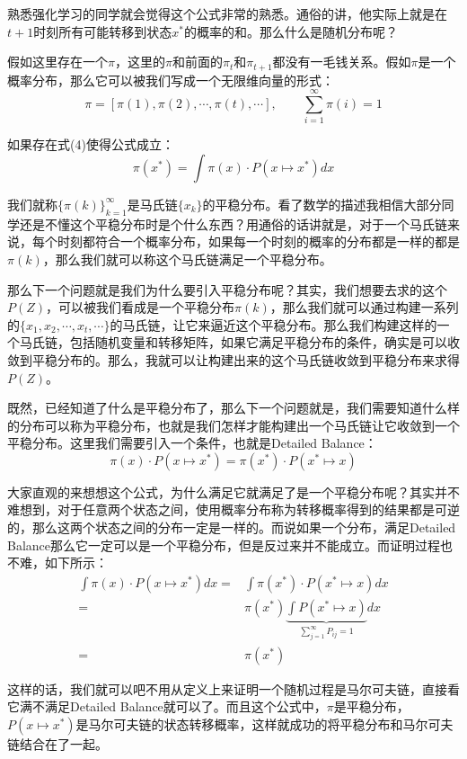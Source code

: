 \documentclass[a4paper]{article}
\begin{document}
熟悉强化学习的同学就会觉得这个公式非常的熟悉。通俗的讲，他实际上就是在$t+1$时刻所有可能转移到状态$x^\ast$的概率的和。那么什么是随机分布呢？

假如这里存在一个$\pi$，这里的$\pi$和前面的$\pi_{t}$和$\pi_{t+1}$都没有一毛钱关系。假如$\pi$是一个概率分布，那么它可以被我们写成一个无限维向量的形式：
\begin{equation}
    \pi = [\pi(1),\pi(2),\cdots,\pi(t),\cdots], \qquad \sum_{i=1}^\infty \pi(i) = 1
\end{equation}

如果存在式(4)使得公式成立：
\begin{equation}
    \pi(x^\ast) = \int \pi(x)\cdot P(x\mapsto x^\ast) dx
\end{equation}

我们就称$\{ \pi(k) \}_{k=1}^\infty $是马氏链$\{x_{k}\}$的平稳分布。看了数学的描述我相信大部分同学还是不懂这个平稳分布时是个什么东西？用通俗的话讲就是，对于一个马氏链来说，每个时刻都符合一个概率分布，如果每一个时刻的概率的分布都是一样的都是$\pi(k)$，那么我们就可以称这个马氏链满足一个平稳分布。

那么下一个问题就是我们为什么要引入平稳分布呢？其实，我们想要去求的这个$P(Z)$，可以被我们看成是一个平稳分布$\pi(k)$，那么我们就可以通过构建一系列的$\{ x_1,x_2,\cdots,x_t,\cdots \}$的马氏链，让它来逼近这个平稳分布。那么我们构建这样的一个马氏链，包括随机变量和转移矩阵，如果它满足平稳分布的条件，确实是可以收敛到平稳分布的。那么，我就可以让构建出来的这个马氏链收敛到平稳分布来求得$P(Z)$。

既然，已经知道了什么是平稳分布了，那么下一个问题就是，我们需要知道什么样的分布可以称为平稳分布，也就是我们怎样才能构建出一个马氏链让它收敛到一个平稳分布。这里我们需要引入一个条件，也就是Detailed Balance：
\begin{equation}
    \pi(x)\cdot P(x\mapsto x^\ast) = \pi(x^\ast)\cdot P(x^\ast \mapsto x)
\end{equation}

大家直观的来想想这个公式，为什么满足它就满足了是一个平稳分布呢？其实并不难想到，对于任意两个状态之间，使用概率分布称为转移概率得到的结果都是可逆的，那么这两个状态之间的分布一定是一样的。而说如果一个分布，满足Detailed Balance那么它一定可以是一个平稳分布，但是反过来并不能成立。而证明过程也不难，如下所示：
\begin{equation}
    \begin{split}
        \int \pi(x)\cdot P(x\mapsto x^\ast)dx 
        = & \int \pi(x^\ast)\cdot P(x^\ast \mapsto x) dx \\ 
        = & \pi(x^\ast) \underbrace{\int P(x^\ast \mapsto x)}_{\sum_{j=1}^\infty P_{ij} = 1 } dx \\
        = & \pi(x^\ast)
    \end{split}
\end{equation}

这样的话，我们就可以吧不用从定义上来证明一个随机过程是马尔可夫链，直接看它满不满足Detailed Balance就可以了。而且这个公式中，$\pi$是平稳分布，$P(x\mapsto x^\ast)$是马尔可夫链的状态转移概率，这样就成功的将平稳分布和马尔可夫链结合在了一起。
\end{document}
